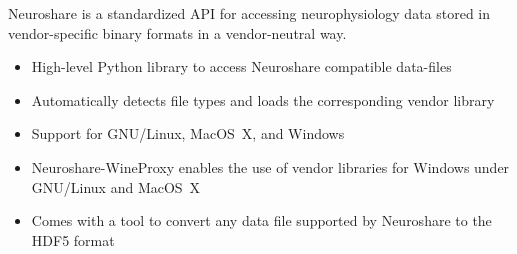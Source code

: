 \begin{multicols}{3}
% 
% 



Neuroshare is a standardized API for accessing neurophysiology
data stored in vendor-specific binary formats in a vendor-neutral
way.

\begin{itemize}[nolistsep,topsep=0em,leftmargin=1pc]
\item High-level Python library to access Neuroshare compatible data-files
\item Automatically detects file types and loads the corresponding vendor library
\item Support for GNU/Linux, MacOS~X, and Windows
\item Neuroshare-WineProxy enables the use of vendor libraries for Windows under GNU/Linux and MacOS~X
\item Comes with a tool to convert any data file supported by Neuroshare to the HDF5 format
\end{itemize}


\end{multicols}
